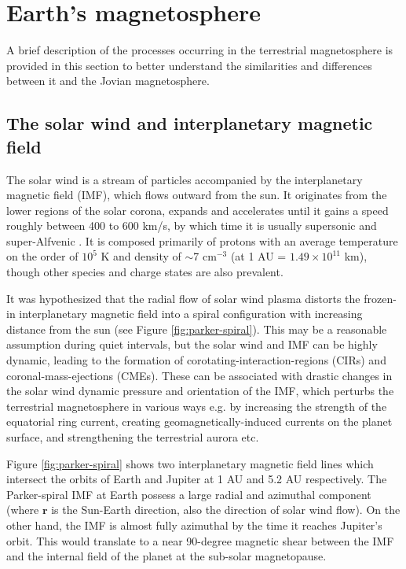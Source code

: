 \section{Earth's magnetosphere}
A brief description of the processes occurring in the terrestrial magnetosphere is provided in this section to better understand the similarities and differences between it and the Jovian magnetosphere.

\subsection{The solar wind and interplanetary magnetic field}
The solar wind is a stream of particles accompanied by the interplanetary magnetic field (IMF), which flows outward from the sun. It originates from the lower regions of the solar corona, expands and accelerates until it gains a speed roughly between 400 to 600 km/s, by which time it is usually supersonic and super-Alfvenic \cite{Gombosi1998PhysicsEnvironment}. It is composed primarily of protons with an average temperature on the order of $10^5$ K and density of $\sim$7 cm$^{-3}$ (at 1 AU = $1.49 \times 10^{11}$ km), though other species and charge states are also prevalent.

It was hypothesized that the radial flow of solar wind plasma distorts the frozen-in interplanetary magnetic field into a spiral configuration with increasing distance from the sun \cite{Parker1958DynamicsFields.,Ness1964SolarField} (see Figure \ref{fig:parker-spiral}). This may be a reasonable assumption during quiet intervals, but the solar wind and IMF can be highly dynamic, leading to the formation of corotating-interaction-regions (CIRs) and coronal-mass-ejections (CMEs). These can be associated with drastic changes in the solar wind dynamic pressure and orientation of the IMF, which perturbs the terrestrial magnetosphere in various ways \cite{Borovsky2006DifferencesStorms,Denton2006GeomagneticWind} e.g. by increasing the strength of the equatorial ring current, creating geomagnetically-induced currents on the planet surface, and strengthening the terrestrial aurora etc.

Figure \ref{fig:parker-spiral} shows two interplanetary magnetic field lines which intersect the orbits of Earth and Jupiter at 1 AU and 5.2 AU respectively. The Parker-spiral IMF at Earth possess a large radial and azimuthal component (where $\mathbf{r}$ is the Sun-Earth direction, also the direction of solar wind flow). On the other hand, the IMF is almost fully azimuthal by the time it reaches Jupiter's orbit. This would translate to a near 90-degree magnetic shear between the IMF and the internal field of the planet at the sub-solar magnetopause. 

